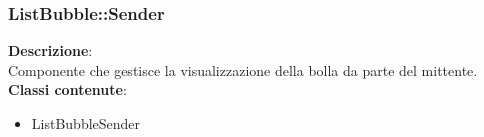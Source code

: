 \clearpage

\subsubsection{ListBubble::Sender}
   \FloatBarrier
\FloatBarrier
\textbf{Descrizione}:\\
 Componente che gestisce la visualizzazione della bolla da parte del mittente. 
\\ \textbf{Classi contenute}:\\
\begin{itemize}
\item ListBubbleSender
\end{itemize}


\clearpage

